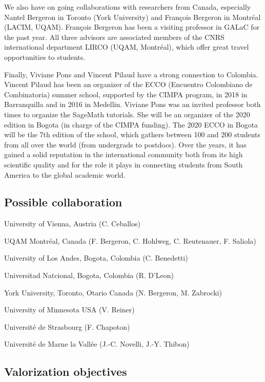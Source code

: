 \documentclass[a4paper,12pt]{article}
\begin{document}
We also have on going collaborations with researchers from Canada, especially Nantel Bergeron in Toronto (York University) and François Bergeron in Montréal (LACIM, UQAM). François Bergeron has been a visiting professor in GALaC for the past year. All three advisors are associated members of the CNRS international department LIRCO (UQAM, Montréal), which offer great travel opportunities to students. 

Finally, Viviane Pons and Vincent Pilaud have a strong connection to Colombia. Vincent Pilaud has been an organizer of the ECCO (Encuentro Colombiano de Combinatoria) summer school, supported by the CIMPA program, in 2018 in Barranquilla and in 2016 in Medellin. Viviane Pons was an invited professor both times to organize the SageMath tutorials. She will be an organizer of the 2020 edition in Bogota (in charge of the CIMPA funding). The 2020 ECCO in Bogota will be the 7th edition of the school, which gathers between 100 and 200 students from all over the world (from undergrads to postdocs). Over the years, it has gained a solid reputation in the international community both from its high scientific quality and for the role it plays in connecting students from South America to the global academic world. 

\subsection{Possible collaboration}

\begin{compactitem}
\item University of Vienna, Austria (C. Ceballos)
\item UQAM Montréal, Canada (F. Bergeron, C. Hohlweg, C. Reutenauer, F. Saliola)
\item University of Los Andes, Bogota, Colombia (C. Benedetti)
\item Universitad Natcional, Bogota, Colombia (R. D'Leon)
\item York University, Toronto, Otario Canada (N. Bergeron, M. Zabrocki)
\item University of Minnesota USA (V. Reiner)
\item Université de Strasbourg (F. Chapoton)
\item Université de Marne la Vallée (J.-C. Novelli, J.-Y. Thibon)
\end{compactitem}

\subsection{Valorization objectives}
\end{document}
